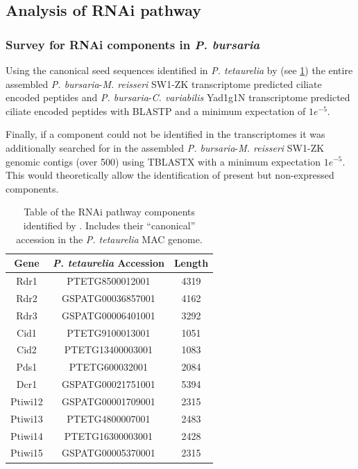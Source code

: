 \subsection{Analysis of RNAi pathway}

\subsubsection{Survey for RNAi components in \textit{P. bursaria}}

Using the canonical seed sequences identified in \textit{P. tetaurelia}
by \citep{Marker2014} (see \cref{tab:rnai_seeds}) the entire assembled 
\textit{P. bursaria}-\textit{M. reisseri} SW1-ZK transcriptome predicted
ciliate encoded peptides and
\textit{P. bursaria}-\textit{C. variabilis} Yad1g1N transcriptome predicted 
ciliate encoded peptides with BLASTP and a minimum expectation
of \(1e^{-5}\).

Finally, if a component could not be identified in the transcriptomes
it was additionally searched for in the assembled \textit{P. bursaria}-\textit{M. reisseri} SW1-ZK
genomic contigs (over \SI{500}{\bp}) using TBLASTX with a minimum expectation \(1e^{-5}\).
This would theoretically allow the identification of present but non-expressed components.

\begin{table}
    \centering
    \begin{tabular}{|c|c|c|}
        \hline
        \textbf{Gene} & \textbf{\textit{P. tetaurelia} Accession} & \textbf{Length} \\
        \hline
        Rdr1 & PTETG8500012001 & 4319 \\ 
        Rdr2 & GSPATG00036857001 & 4162 \\
        Rdr3 & GSPATG00006401001 & 3292 \\
        Cid1 & PTETG9100013001 & 1051 \\
        Cid2 & PTETG13400003001 & 1083 \\
        Pds1 & PTETG600032001 & 2084 \\
        Dcr1 & GSPATG00021751001 & 5394 \\
        Ptiwi12 & GSPATG00001709001 & 2315 \\
        Ptiwi13 & PTETG4800007001 & 2483 \\
        Ptiwi14 & PTETG16300003001 & 2428 \\
        Ptiwi15 & GSPATG00005370001 & 2315 \\
        \hline
    \end{tabular}
    \caption[RNAi pathway components from \citep{Marker2014}]{Table of
    the RNAi pathway components identified by \citep{Marker2014}. 
    Includes their ``canonical'' accession in the \textit{P. tetaurelia}
MAC genome.}
    \label{tab:rnai_seeds}
\end{table}

